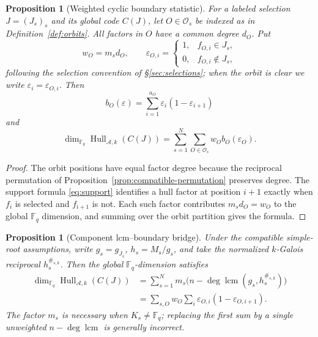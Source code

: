 \documentclass[10pt,a4paper]{article}
\newcommand{\F}{\mathbb F}
\newcommand{\A}{\mathcal A}
\newcommand{\Os}{\mathcal O_s}
\newcommand{\Hull}{\operatorname{Hull}}
\numberwithin{equation}{section}
\theoremstyle{plain}
\newtheorem{proposition}[theorem]{Proposition}
\theoremstyle{definition}
\theoremstyle{remark}
\begin{document}
\begin{proposition}[Weighted cyclic boundary statistic]\label{prop:boundary}
For a labeled selection $J=(J_s)_s$ and its global code $C(J)$, let $O\in\Os$ be
indexed as in Definition~\ref{def:orbits}. All factors in $O$ have a common
degree $d_O$. Put
\[
w_O=m_s d_O,
\qquad
\varepsilon_{O,i}=\begin{cases}1,&f_{O,i}\in J_s,\\0,&f_{O,i}\notin J_s,\end{cases}
\]
following the selection convention of \S\ref{sec:selections}; when the orbit is
clear we write $\varepsilon_i=\varepsilon_{O,i}$. Then
\begin{equation}\label{eq:boundary}
b_O(\varepsilon)=\sum_{i=1}^{a_O}\varepsilon_i(1-\varepsilon_{i+1})
\end{equation}
and
\begin{equation}\label{eq:hull-dim}
\dim_{\F_q}\Hull_{\A,k}(C(J))
 =\sum_{s=1}^{N}\sum_{O\in\Os}w_O b_O(\varepsilon_O).
\end{equation}
\end{proposition}

\begin{proof}
The orbit positions have equal factor degree because the reciprocal permutation
of Proposition~\ref{prop:compatible-permutation} preserves degree. The support
formula \eqref{eq:support} identifies a hull factor at position $i+1$ exactly
when $f_i$ is selected and $f_{i+1}$ is not. Each such factor contributes
$m_s d_O=w_O$ to the global $\F_q$ dimension, and summing over the orbit
partition gives the formula.
\end{proof}

\begin{proposition}[Component lcm--boundary bridge]\label{prop:lcm-bridge}
Under the compatible simple-root assumptions, write $g_s=g_{J_s}$,
$h_s=M_s/g_s$, and take the normalized $k$-Galois reciprocal
$h_s^{\#_{s,k}}$. Then the global $\F_q$-dimension satisfies
\begin{equation}\label{eq:lcm-bridge}
\begin{aligned}
\dim_{\F_q}\Hull_{\A,k}(C(J))
 &=\sum_{s=1}^{N}m_s\bigl(n-\deg\operatorname{lcm}(g_s,h_s^{\#_{s,k}})\bigr)\\
 &=\sum_{s,O}w_O\sum_i\varepsilon_{O,i}(1-\varepsilon_{O,i+1}).
\end{aligned}
\end{equation}
The factor $m_s$ is necessary when $K_s\ne\F_q$; replacing the first sum by a
single unweighted $n-\deg\operatorname{lcm}$ is generally incorrect.
\end{proposition}
\end{document}
